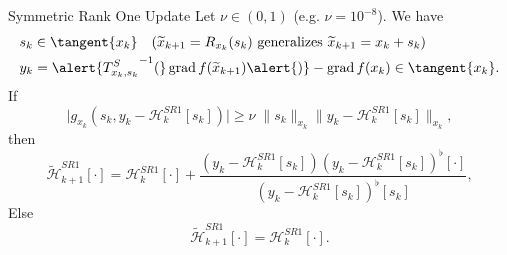 \documentclass{beamer}
\begin{document}
\begin{frame}{Symmetric Rank One Update}
    Let $\nu \in (0,1)$ (e.g. $\nu = 10^{-8}$). We have
    \begin{align*}
        & s_k \in \tangent{x_k} \quad (\widetilde{x}_{k+1} = R_{x_k}(s_k) \text{ generalizes } \widetilde{x}_{k+1} = x_k + s_k) \\
        & y_k = \alert{{T^{S}_{x_k, s_k}}^{-1} (} \operatorname{grad}f(\widetilde{x}_{k+1}) \alert{)} - \operatorname{grad}f(x_k) \in \tangent{x_k}.
    \end{align*}
    If
    \begin{equation*}
        \lvert g_{x_k}(s_k, y_k - \mathcal{H}^{SR1}_k[s_k]) \rvert \geq \nu \; \lVert s_k \rVert_{x_k} \lVert y_k - \mathcal{H}^{SR1}_k[s_k] \rVert_{x_k},
    \end{equation*}
    then
    \begin{equation*}
        \widetilde{\mathcal{H}}^{SR1}_{k+1} [\cdot] = \mathcal{H}^{SR1}_k [\cdot] + \frac{(y_k - \mathcal{H}^{SR1}_k [s_k]) (y_k - \mathcal{H}^{SR1}_k [s_k])^{\flat} [\cdot] }{(y_k - \mathcal{H}^{SR1}_k [s_k])^{\flat} [s_k]},
    \end{equation*}
    Else 
    \begin{equation*}
        \widetilde{\mathcal{H}}^{SR1}_{k+1} [\cdot] = \mathcal{H}^{SR1}_k [\cdot].
    \end{equation*}
\end{frame}
\end{document}
